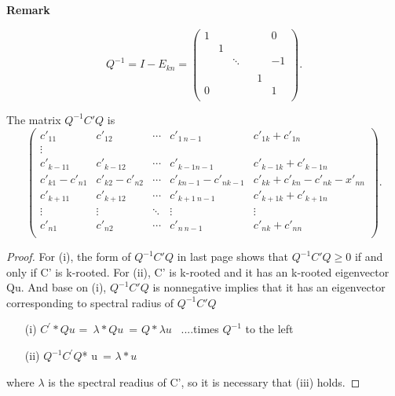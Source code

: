 \documentclass{beamer}
\theoremstyle{plain}
\theoremstyle{definition}
\begin{document}
\begin{frame}{\bf Remark}

$$Q^{-1}=I-E_{kn}=\begin{pmatrix}
1 &  & & &  & 0 \\
 & 1 &  &      &  &  \\
 &  & \ddots & &  & -1 \\
 &  &        & &  &  \\
  &  & & & 1 &  \\
0 &  & & &  & 1 \\
\end{pmatrix}.$$

The matrix $Q^{-1}C'Q$ is
$$\begin{pmatrix}
c'_{11}     & c'_{12} & \cdots     & c'_{1\ n-1} & c'_{1k}+c'_{1n} \\
\vdots \\
c'_{k-11}     & c'_{k-1 2}           & \cdots     & c'_{k-1 n-1} & c'_{k-1k}+c'_{k-1n} \\
c'_{k1}-c'_{n1} & c'_{k2}-c'_{n2} &\cdots      &c'_{kn-1}-c'_{nk-1}& c'_{kk}+c'_{kn}-c'_{nk}-x'_{nn}\\
c'_{k+11}     & c'_{k+12}           & \cdots     & c'_{k+1\ n-1} & c'_{k+1k}+c'_{k+1n} \\
\vdots              & \vdots & \ddots              & \vdots & \vdots \\
c'_{n1}             & c'_{n2} & \cdots             & c'_{n\ n-1} & c'_{nk}+c'_{nn} \\
\end{pmatrix}.
$$
\end{frame}

\begin{frame}{}

	\begin{proof}
        For (i), the form of $Q^{-1}C'Q$ in last page shows that $Q^{-1}C'Q \geq 0$ if and only if C' is k-rooted.
	For (ii), C' is k-rooted and it has an k-rooted eigenvector Qu. And base on (i), $Q^{-1}C'Q$ is nonnegative implies that it has an eigenvector corresponding to spectral radius of $Q^{-1}C'Q$ 
	\begin{enumerate}
        \item[(i)] $C^{ '}*Qu$ = $\lambda * Qu $ = $Q * \lambda u$  ....times $Q^{-1}$ to the left
        \item[(ii)] $Q^{-1} C^{ '}Q$* u = $\lambda * u$
    \end{enumerate}
where $\lambda$ is the spectral readius of C', so it is necessary that (iii) holds.

    \end{proof}

\end{frame}
\end{document}
